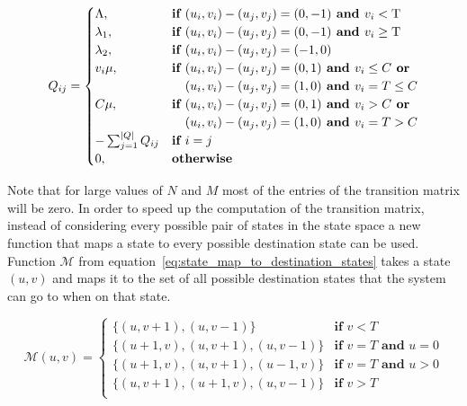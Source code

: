 \begin{equation} \label{eq:markov_transition_rate}
    Q_{ij} =
    \begin{cases}
        \Lambda, & \textbf{if } (u_i, v_i) - (u_j, v_j) = (0,-1) \textbf{ and }
        v_i < \text{T} \\
        \lambda_1, & \textbf{if } (u_i, v_i) - (u_j, v_j) = (0,-1)
        \textbf{ and } v_i \geq \text{T} \\
        \lambda_2, & \textbf{if } (u_i, v_i) - (u_j, v_j) = (-1,0) \\
        v_i \mu, & \textbf{if } (u_i, v_i) - (u_j, v_j) = (0,1) \textbf{ and }
        v_i \leq C \textbf{ or} \\ & \hspace{0.37cm}(u_i, v_i) - (u_j, v_j) =
        (1,0) \textbf{ and } v_i = T \leq C \\
        C \mu, & \textbf{if } (u_i, v_i) - (u_j, v_j) = (0,1) \textbf{ and }
        v_i > C
        \textbf{ or} \\ & \hspace{0.37cm}(u_i, v_i) - (u_j, v_j) = (1,0)
        \textbf{ and } v_i = T > C\\
        -\sum_{j=1}^{|Q|}{Q_{ij}} & \textbf{if } i = j \\
        0, & \textbf{otherwise}
    \end{cases}
\end{equation}

Note that for large values of \(N\) and \(M\) most of the entries of the
transition matrix will be zero.
In order to speed up the computation of the transition matrix, instead of
considering every possible pair of states in the state space a new function
that maps a state to every possible destination state can be used.
Function \(\mathcal{M}\) from
equation~\eqref{eq:state_map_to_destination_states}
takes a state \((u, v)\) and maps it to the set of
all possible destination states that the system can go to when on that state.

\begin{equation}\label{eq:state_map_to_destination_states}
    \mathcal{M}(u, v) =
    \begin{cases}
        \{(u, v + 1), (u, v - 1)\} & \textbf{if } v < T \\
        \{(u + 1, v), (u, v + 1), (u, v - 1)\} & \textbf{if } v = T
        \textbf{ and } u = 0 \\
        \{(u + 1, v), (u, v + 1), (u - 1, v)\} & \textbf{if } v = T
        \textbf{ and } u > 0 \\
        \{(u, v + 1), (u + 1, v), (u, v - 1)\} & \textbf{if } v > T \\
    \end{cases}
\end{equation}



